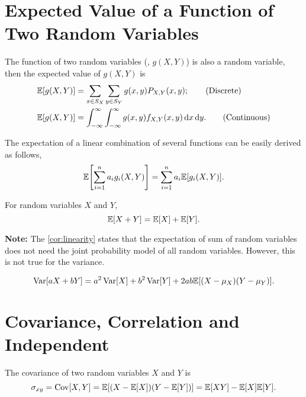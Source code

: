 \section{Expected Value of a Function of Two Random Variables}
\begin{theorem}
    The function of two random variables (\ie, $g(X,Y)$) is also a random variable, then the expected value of $g(X,Y)$ is
    \begin{align}
        \E{g(X,Y)} &= \sum_{x\in S_X}\sum_{y\in S_Y}g(x,y)P_{X,Y}(x,y); \tag{Discrete}\\
        \E{g(X,Y)} &= \int_{-\infty}^{\infty}\int_{-\infty}^{\infty}g(x,y)f_{X,Y}(x,y)\diff x\diff y. \tag{Continuous}
    \end{align}
\end{theorem}

\begin{theorem}\label{thm:linearity}
    The expectation of a linear combination of several functions can be easily derived as follows,
    \[\E{\sum_{i=1}^{n}a_i g_i(X,Y)}=\sum_{i=1}^{n}a_i\E{g_i(X,Y)}.\]
\end{theorem}

\begin{corollary}
    \label{cor:linearity}
    For random variables $X$ and $Y$,
    \[\E{X+Y}=\E{X}+\E{Y}.\]
\end{corollary}
\textbf{Note:} The \cref{cor:linearity} states that the expectation of sum of random variables does not need the joint probability model of all random variables. However, this is not true for the variance.

\begin{corollary}
    \label{thm:variance_of_sum}
    \[\Var[aX+bY]=a^2\Var[X]+b^2\Var[Y]+2ab\E{(X-\mu_X)(Y-\mu_Y)}.\]
\end{corollary}


\section{Covariance, Correlation and Independent}
\begin{definition}[Covariance]
    The covariance of two random variables $X$ and $Y$ is
    \[\sigma_{xy}=\Cov[X,Y]=\E{(X-\E{X})(Y-\E{Y})}=\E{XY}-\E{X}\E{Y}.\]
\end{definition}

